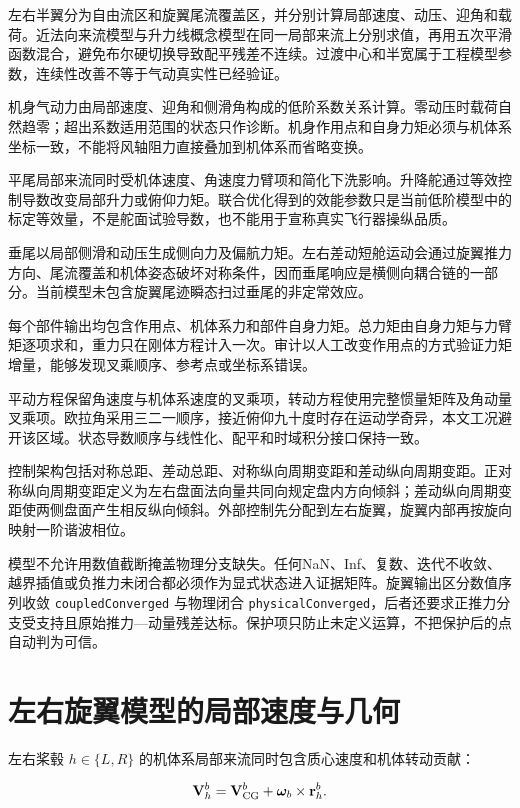 \documentclass[UTF8,12pt,oneside,openany,fontset=windows]{ctexbook}
\begin{document}
左右半翼分为自由流区和旋翼尾流覆盖区，并分别计算局部速度、动压、迎角和载荷。近法向来流模型与升力线概念模型在同一局部来流上分别求值，再用五次平滑函数混合，避免布尔硬切换导致配平残差不连续。过渡中心和半宽属于工程模型参数，连续性改善不等于气动真实性已经验证。

机身气动力由局部速度、迎角和侧滑角构成的低阶系数关系计算。零动压时载荷自然趋零；超出系数适用范围的状态只作诊断。机身作用点和自身力矩必须与机体系坐标一致，不能将风轴阻力直接叠加到机体系而省略变换。

平尾局部来流同时受机体速度、角速度力臂项和简化下洗影响。升降舵通过等效控制导数改变局部升力或俯仰力矩。联合优化得到的效能参数只是当前低阶模型中的标定等效量，不是舵面试验导数，也不能用于宣称真实飞行器操纵品质。

垂尾以局部侧滑和动压生成侧向力及偏航力矩。左右差动短舱运动会通过旋翼推力方向、尾流覆盖和机体姿态破坏对称条件，因而垂尾响应是横侧向耦合链的一部分。当前模型未包含旋翼尾迹瞬态扫过垂尾的非定常效应。

每个部件输出均包含作用点、机体系力和部件自身力矩。总力矩由自身力矩与力臂矩逐项求和，重力只在刚体方程计入一次。审计以人工改变作用点的方式验证力矩增量，能够发现叉乘顺序、参考点或坐标系错误。

平动方程保留角速度与机体系速度的叉乘项，转动方程使用完整惯量矩阵及角动量叉乘项。欧拉角采用三二一顺序，接近俯仰九十度时存在运动学奇异，本文工况避开该区域。状态导数顺序与线性化、配平和时域积分接口保持一致。

控制架构包括对称总距、差动总距、对称纵向周期变距和差动纵向周期变距。正对称纵向周期变距定义为左右盘面法向量共同向规定盘内方向倾斜；差动纵向周期变距使两侧盘面产生相反纵向倾斜。外部控制先分配到左右旋翼，旋翼内部再按旋向映射一阶谐波相位。

模型不允许用数值截断掩盖物理分支缺失。任何NaN、Inf、复数、迭代不收敛、越界插值或负推力未闭合都必须作为显式状态进入证据矩阵。旋翼输出区分数值序列收敛 \texttt{coupledConverged} 与物理闭合 \texttt{physicalConverged}，后者还要求正推力分支受支持且原始推力—动量残差达标。保护项只防止未定义运算，不把保护后的点自动判为可信。

\section{左右旋翼模型的局部速度与几何}

左右桨毂 \(h\in\{L,R\}\) 的机体系局部来流同时包含质心速度和机体转动贡献：

\begin{equation}
\mathbf V_h^b=\mathbf V_{\rm CG}^b+\boldsymbol\omega_b\times\mathbf r_h^b.
\end{equation}
\end{document}
